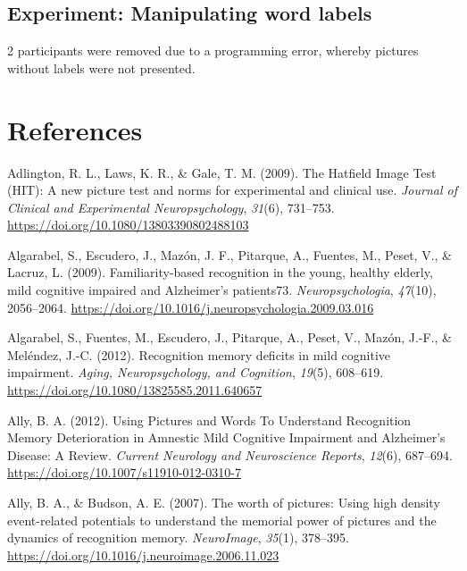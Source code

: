 \documentclass[
  11pt,
]{article}
\begin{document}
\hypertarget{experiment-manipulating-word-labels}{%
\subsection{Experiment: Manipulating word
labels}\label{experiment-manipulating-word-labels}}

2 participants were removed due to a programming error, whereby pictures
without labels were not presented.

\newpage

\hypertarget{references}{%
\section{References}\label{references}}

\setlength{\parindent}{-0.2in}
\setlength{\leftskip}{0.2in}
\setlength{\parskip}{8pt}

\noindent

\hypertarget{refs}{}
\leavevmode\hypertarget{ref-adlington2009}{}%
Adlington, R. L., Laws, K. R., \& Gale, T. M. (2009). The Hatfield Image
Test (HIT): A new picture test and norms for experimental and clinical
use. \emph{Journal of Clinical and Experimental Neuropsychology},
\emph{31}(6), 731--753. \url{https://doi.org/10.1080/13803390802488103}

\leavevmode\hypertarget{ref-algarabel2009}{}%
Algarabel, S., Escudero, J., Mazón, J. F., Pitarque, A., Fuentes, M.,
Peset, V., \& Lacruz, L. (2009). Familiarity-based recognition in the
young, healthy elderly, mild cognitive impaired and Alzheimer's
patients73. \emph{Neuropsychologia}, \emph{47}(10), 2056--2064.
\url{https://doi.org/10.1016/j.neuropsychologia.2009.03.016}

\leavevmode\hypertarget{ref-algarabel2012}{}%
Algarabel, S., Fuentes, M., Escudero, J., Pitarque, A., Peset, V.,
Mazón, J.-F., \& Meléndez, J.-C. (2012). Recognition memory deficits in
mild cognitive impairment. \emph{Aging, Neuropsychology, and Cognition},
\emph{19}(5), 608--619.
\url{https://doi.org/10.1080/13825585.2011.640657}

\leavevmode\hypertarget{ref-ally2012}{}%
Ally, B. A. (2012). Using Pictures and Words To Understand Recognition
Memory Deterioration in Amnestic Mild Cognitive Impairment and
Alzheimer's Disease: A Review. \emph{Current Neurology and Neuroscience
Reports}, \emph{12}(6), 687--694.
\url{https://doi.org/10.1007/s11910-012-0310-7}

\leavevmode\hypertarget{ref-ally2007}{}%
Ally, B. A., \& Budson, A. E. (2007). The worth of pictures: Using high
density event-related potentials to understand the memorial power of
pictures and the dynamics of recognition memory. \emph{NeuroImage},
\emph{35}(1), 378--395.
\url{https://doi.org/10.1016/j.neuroimage.2006.11.023}
\end{document}

